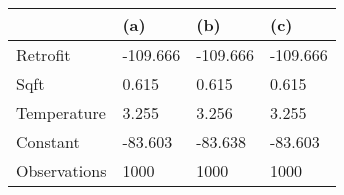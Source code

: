 \begin{tabular}{llll}
\toprule
 & (a) & (b) & (c) \\
\midrule
Retrofit & -109.666 & -109.666 & -109.666 \\
Sqft & 0.615 & 0.615 & 0.615 \\
Temperature & 3.255 & 3.256 & 3.255 \\
Constant & -83.603 & -83.638 & -83.603 \\
Observations & 1000 & 1000 & 1000 \\
\bottomrule
\end{tabular}
